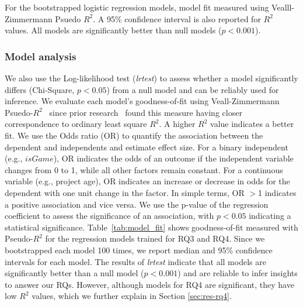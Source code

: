 \begin{table*}
    \caption{For the bootstrapped logistic regression models, model fit measured using Vealll-Zimmermann Psuedo $R^2$.  A 95\% confidence interval is also reported for $R^2$ values. All models are significantly better than null models ($p<0.001$).}
    \label{tab:model_fit}
    \centering
   \vspace{-10pt}
    
    \vspace{-10pt}
\end{table*}






\subsubsection{Model analysis}
We also use the Log-likelihood test (\textit{lrtest})  to assess whether a model significantly differs (Chi-Square, $p<0.05$) from a null model and can be reliably used for inference.
We evaluate each model's goodness-of-fit using Veall-Zimmermann Psuedo-$R^2$~\cite{veall1994evaluating} since prior research~\cite{smith2013comparison} found this measure having closer correspondence to ordinary least square $R^2$.  A higher $R^2$ value indicates a better fit.  
We use the Odds ratio (OR) to quantify the association between the dependent and independents and estimate effect size. 
For a binary independent (e.g., $isGame$), OR indicates the odds of an outcome if the independent variable changes from 0 to 1, while all other factors remain constant. For a continuous variable (e.g., project age), OR indicates an increase or decrease in odds for the dependent with one unit change in the factor. In simple terms, OR $>$1 indicates a positive association and vice versa. We use the p-value of the regression coefficient to assess the significance of an association, with $p<0.05$ indicating a statistical significance.
Table~\ref{tab:model_fit} shows goodness-of-fit measured with Pseudo-$R^2$  for the regression models trained for RQ3 and RQ4. Since we bootstrapped each model 100 times, we report median and 95\% confidence intervals for each model. The results of \textit{lrtest} indicate that all models are significantly better than a null model ($p<0.001$) and are reliable to infer insights to answer our RQs. However, although models for RQ4 are significant, they have low $R^2$ values, which we further explain in Section \ref{sec:res-rq4}.

